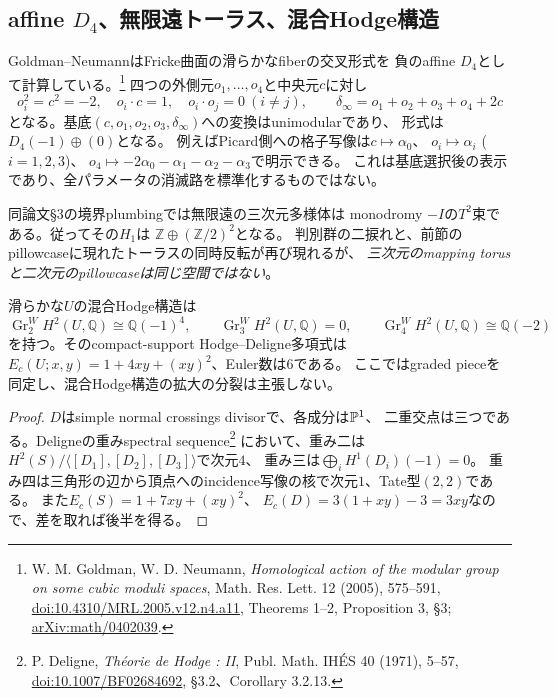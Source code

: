 \subsection{affine \texorpdfstring{$D_4$}{D4}、無限遠トーラス、混合Hodge構造}
Goldman--NeumannはFricke曲面の滑らかなfiberの交叉形式を
負のaffine $D_4$として計算している。\footnote{
W. M. Goldman, W. D. Neumann, \emph{Homological action of the modular group on some cubic moduli spaces},
Math. Res. Lett. 12 (2005), 575--591,
\href{https://doi.org/10.4310/MRL.2005.v12.n4.a11}{doi:10.4310/MRL.2005.v12.n4.a11},
Theorems 1--2, Proposition 3, \S3;
\href{https://arxiv.org/abs/math/0402039}{arXiv:math/0402039}.}
四つの外側元$o_1,\ldots,o_4$と中央元$c$に対し
\[
 o_i^2=c^2=-2,\quad o_i\cdot c=1,\quad o_i\cdot o_j=0\ (i\ne j),
 \qquad \delta_\infty=o_1+o_2+o_3+o_4+2c
\]
となる。基底$(c,o_1,o_2,o_3,\delta_\infty)$への変換はunimodularであり、
形式は$D_4(-1)\oplus(0)$となる。
例えばPicard側への格子写像は$c\mapsto\alpha_0$、
$o_i\mapsto\alpha_i$ ($i=1,2,3$)、
$o_4\mapsto-2\alpha_0-\alpha_1-\alpha_2-\alpha_3$で明示できる。
これは基底選択後の表示であり、全パラメータの消滅路を標準化するものではない。

同論文\S3の境界plumbingでは無限遠の三次元多様体は
monodromy $-I$の$T^2$束である。従ってその$H_1$は
$\mathbb Z\oplus(\mathbb Z/2)^2$となる。
判別群の二捩れと、前節のpillowcaseに現れたトーラスの同時反転が再び現れるが、
\emph{三次元のmapping torusと二次元のpillowcaseは同じ空間ではない}。

\begin{proposition}[重み二の四方向と重み四の境界方向]
\label{prop:lg-mixed-hodge}
滑らかな$U$の混合Hodge構造は
\[
 \operatorname{Gr}_2^W H^2(U,\mathbb Q)\cong\mathbb Q(-1)^4,
 \qquad\operatorname{Gr}_3^W H^2(U,\mathbb Q)=0,
 \qquad\operatorname{Gr}_4^W H^2(U,\mathbb Q)\cong\mathbb Q(-2)
\]
を持つ。そのcompact-support Hodge--Deligne多項式は
$E_c(U;x,y)=1+4xy+(xy)^2$、Euler数は$6$である。
ここではgraded pieceを同定し、混合Hodge構造の拡大の分裂は主張しない。
\end{proposition}
\begin{proof}
$D$はsimple normal crossings divisorで、各成分は$\mathbb P^1$、
二重交点は三つである。Deligneの重みspectral sequence\footnote{
P. Deligne, \emph{Th\'eorie de Hodge : II}, Publ. Math. IH\'ES 40 (1971), 5--57,
\href{https://doi.org/10.1007/BF02684692}{doi:10.1007/BF02684692},
\S3.2、Corollary 3.2.13.}
において、重み二は$H^2(S)/\langle[D_1],[D_2],[D_3]\rangle$で次元$4$、
重み三は$\bigoplus_i H^1(D_i)(-1)=0$。
重み四は三角形の辺から頂点へのincidence写像の核で次元$1$、Tate型$(2,2)$である。
また$E_c(S)=1+7xy+(xy)^2$、
$E_c(D)=3(1+xy)-3=3xy$なので、差を取れば後半を得る。
\end{proof}

